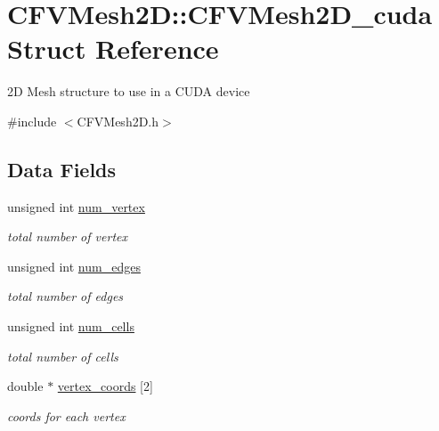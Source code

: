 \hypertarget{structFVL_1_1CFVMesh2D_1_1CFVMesh2D__cuda}{
\section{CFVMesh2D::CFVMesh2D\_\-cuda Struct Reference}
\label{d6/d30/structFVL_1_1CFVMesh2D_1_1CFVMesh2D__cuda}
}


2D Mesh structure to use in a CUDA device  




{\ttfamily \#include $<$CFVMesh2D.h$>$}

\subsection*{Data Fields}
\begin{DoxyCompactItemize}
\item 
unsigned int \hyperlink{structFVL_1_1CFVMesh2D_1_1CFVMesh2D__cuda_a66b841fd6e58a9fc9b63df4fe982178f}{num\_\-vertex}
\begin{DoxyCompactList}\small\item\em total number of vertex \item\end{DoxyCompactList}\item 
unsigned int \hyperlink{structFVL_1_1CFVMesh2D_1_1CFVMesh2D__cuda_ad1228ae08a3c287de40e4682e6538c12}{num\_\-edges}
\begin{DoxyCompactList}\small\item\em total number of edges \item\end{DoxyCompactList}\item 
unsigned int \hyperlink{structFVL_1_1CFVMesh2D_1_1CFVMesh2D__cuda_aede6f897b05f909a426f36f61b2b8d43}{num\_\-cells}
\begin{DoxyCompactList}\small\item\em total number of cells \item\end{DoxyCompactList}\item 
double $\ast$ \hyperlink{structFVL_1_1CFVMesh2D_1_1CFVMesh2D__cuda_a03658bd1b0082d5bd0726d7ef81c0bc2}{vertex\_\-coords} \mbox{[}2\mbox{]}
\begin{DoxyCompactList}\small\item\em coords for each vertex \item\end{DoxyCompactList}\item 

\end{DoxyCompactItemize}
